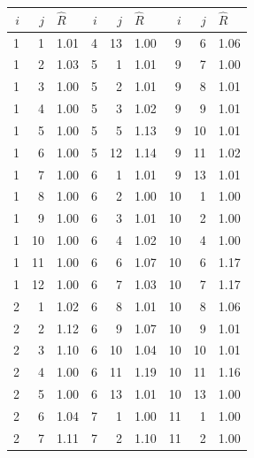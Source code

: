 \begin{table}
    \centering
    \begin{tabular}{|rrl||rrl||rrl|}
    \hline
     $i$ &  $j$ & $\hat{R}$ &  $i$ &  $j$ & $\hat{R}$ &  $i$ &  $j$ & $\hat{R}$ \\
    \hline\hline
       1 &    1 &      1.01 &    4 &   13 &      1.00 &    9 &    6 &      1.06 \\
       1 &    2 &      1.03 &    5 &    1 &      1.01 &    9 &    7 &      1.00 \\
       1 &    3 &      1.00 &    5 &    2 &      1.01 &    9 &    8 &      1.01 \\
       1 &    4 &      1.00 &    5 &    3 &      1.02 &    9 &    9 &      1.01 \\
       1 &    5 &      1.00 &    5 &    5 &      1.13 &    9 &   10 &      1.01 \\
       1 &    6 &      1.00 &    5 &   12 &      1.14 &    9 &   11 &      1.02 \\
       1 &    7 &      1.00 &    6 &    1 &      1.01 &    9 &   13 &      1.01 \\
       1 &    8 &      1.00 &    6 &    2 &      1.00 &   10 &    1 &      1.00 \\
       1 &    9 &      1.00 &    6 &    3 &      1.01 &   10 &    2 &      1.00 \\
       1 &   10 &      1.00 &    6 &    4 &      1.02 &   10 &    4 &      1.00 \\
       1 &   11 &      1.00 &    6 &    6 &      1.07 &   10 &    6 &      1.17 \\
       1 &   12 &      1.00 &    6 &    7 &      1.03 &   10 &    7 &      1.17 \\
       2 &    1 &      1.02 &    6 &    8 &      1.01 &   10 &    8 &      1.06 \\
       2 &    2 &      1.12 &    6 &    9 &      1.07 &   10 &    9 &      1.01 \\
       2 &    3 &      1.10 &    6 &   10 &      1.04 &   10 &   10 &      1.01 \\
       2 &    4 &      1.00 &    6 &   11 &      1.19 &   10 &   11 &      1.16 \\
       2 &    5 &      1.00 &    6 &   13 &      1.01 &   10 &   13 &      1.00 \\
       2 &    6 &      1.04 &    7 &    1 &      1.00 &   11 &    1 &      1.00 \\
       2 &    7 &      1.11 &    7 &    2 &      1.10 &   11 &    2 &      1.00 \\

\end{tabular}
\end{table}
